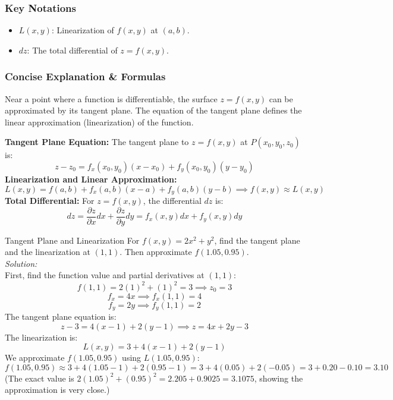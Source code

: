 \documentclass[11pt]{article}
\begin{document}
\subsubsection*{Key Notations}
\begin{itemize}
    \item $L(x,y)$: Linearization of $f(x,y)$ at $(a,b)$.
    \item $dz$: The total differential of $z = f(x,y)$.
\end{itemize}

\subsubsection*{Concise Explanation \& Formulas}
Near a point where a function is differentiable, the surface $z=f(x,y)$ can be approximated by its tangent plane. The equation of the tangent plane defines the linear approximation (linearization) of the function.
\begin{formulabox}
    \textbf{Tangent Plane Equation:} The tangent plane to $z = f(x,y)$ at $P(x_0, y_0, z_0)$ is:
    \[ z - z_0 = f_x(x_0, y_0)(x - x_0) + f_y(x_0, y_0)(y - y_0) \]
    \textbf{Linearization and Linear Approximation:}
    \[ L(x,y) = f(a,b) + f_x(a,b)(x-a) + f_y(a,b)(y-b) \implies f(x,y) \approx L(x,y) \]
    \textbf{Total Differential:} For $z = f(x,y)$, the differential $dz$ is:
    \[ dz = \frac{\partial z}{\partial x}dx + \frac{\partial z}{\partial y}dy = f_x(x,y)dx + f_y(x,y)dy \]
\end{formulabox}

\begin{examplebox}{Tangent Plane and Linearization}
    For $f(x,y) = 2x^2 + y^2$, find the tangent plane and the linearization at $(1, 1)$. Then approximate $f(1.05, 0.95)$.\\
    \textit{Solution:}\\
    First, find the function value and partial derivatives at $(1,1)$:
    \[ f(1,1) = 2(1)^2 + (1)^2 = 3 \implies z_0 = 3 \]
    \[ f_x = 4x \implies f_x(1,1) = 4 \]
    \[ f_y = 2y \implies f_y(1,1) = 2 \]
    The tangent plane equation is:
    \[ z - 3 = 4(x - 1) + 2(y - 1) \implies z = 4x + 2y - 3 \]
    The linearization is:
    \[ L(x,y) = 3 + 4(x - 1) + 2(y - 1) \]
    We approximate $f(1.05, 0.95)$ using $L(1.05, 0.95)$:
    \[ f(1.05, 0.95) \approx 3 + 4(1.05 - 1) + 2(0.95 - 1) = 3 + 4(0.05) + 2(-0.05) = 3 + 0.20 - 0.10 = 3.10 \]
    (The exact value is $2(1.05)^2 + (0.95)^2 = 2.205 + 0.9025 = 3.1075$, showing the approximation is very close.)
\end{examplebox}
\end{document}
